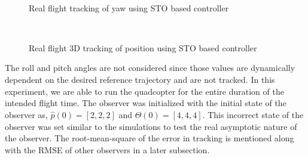 \documentclass[letterpaper%
, twoside%
, 12pt%
,memoire%
, english%
,creativecommons,hyperref%
]{thETS}
\begin{document}
\begin{figure}[H]
	\centering
	 \\ \parbox{0.75\textwidth}{\caption{Real flight tracking of yaw using STO based controller\label{Fig:yawtracSTO}}}
\end{figure}
\begin{figure}[H]
	\centering
	 \\ \parbox{0.75\textwidth}{\caption{Real flight 3D tracking of position using STO based controller\label{Fig:3dSTO}}}
\end{figure}
The roll and pitch angles are not considered since those values are dynamically dependent on the desired reference trajectory and are not tracked. In this experiment, we are able to run the quadcopter for the entire duration of the intended flight time. The observer was initialized with the initial state of the observer as, $\hat{p}(0)=[2,2,2]$ and $\hat{\Theta}(0)=[4,4,4]$. This incorrect state of the observer was set similar to the simulations to test the real asymptotic nature of the observer. The root-mean-square of the error in tracking is mentioned along with the RMSE of other observers in a later subsection.
\end{document}
